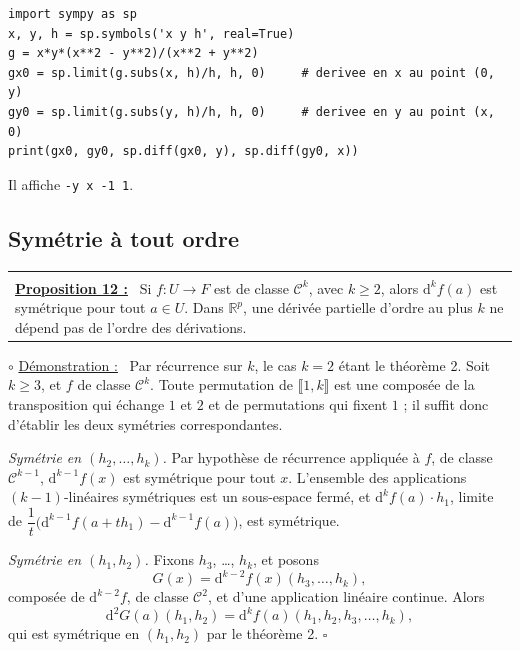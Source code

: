 \documentclass[a4paper,twoside]{report}
\makeatletter
\newenvironment{cadre}%
 {\par\vspace{2mm}\noindent\begin{tabular}{|@{\hspace{4mm}}p{0.93\textwidth}@{\hspace{4mm}}|}
  \hline \\[-2mm]}%
 {\\[2mm] \hline \end{tabular}\par\vspace{3mm}}
\newcommand{\propo}[1]{\textbf{\underline{Proposition #1 :}}~}
\newenvironment{demo}%
 {\par\needspace{4\baselineskip}\vspace{1mm}\noindent$\circ$ \underline{Démonstration :}~\setlength{\parskip}{3pt plus 1pt}}%
 {\hfill$\square$\par\vspace{2mm}}
\newcommand{\R}{\mathbb{R}}
\newcommand{\dd}{\mathrm{d}}                      %
\newcommand{\Cc}{\mathcal{C}}                     %
\makeatother
\begin{document}
\begin{lstlisting}
import sympy as sp
x, y, h = sp.symbols('x y h', real=True)
g = x*y*(x**2 - y**2)/(x**2 + y**2)
gx0 = sp.limit(g.subs(x, h)/h, h, 0)     # derivee en x au point (0, y)
gy0 = sp.limit(g.subs(y, h)/h, h, 0)     # derivee en y au point (x, 0)
print(gx0, gy0, sp.diff(gx0, y), sp.diff(gy0, x))
\end{lstlisting}

\noindent Il affiche \texttt{-y x -1 1}.

\subsection{Symétrie à tout ordre}

\begin{cadre}
\propo{12} Si $f : U \to F$ est de classe $\Cc^{k}$, avec $k \geqslant 2$, alors $\dd^{k} f(a)$ est symétrique pour tout $a \in U$. Dans $\R^{p}$, une dérivée partielle d'ordre au plus $k$ ne dépend pas de l'ordre des dérivations.
\end{cadre}

\begin{demo}
Par récurrence sur $k$, le cas $k = 2$ étant le théorème 2. Soit $k \geqslant 3$, et $f$ de classe $\Cc^{k}$. Toute permutation de $\llbracket 1, k \rrbracket$ est une composée de la transposition qui échange $1$ et $2$ et de permutations qui fixent $1$ ; il suffit donc d'établir les deux symétries correspondantes.

\emph{Symétrie en $(h_{2}, \dots, h_{k})$.} Par hypothèse de récurrence appliquée à $f$, de classe $\Cc^{k - 1}$, $\dd^{k - 1} f(x)$ est symétrique pour tout $x$. L'ensemble des applications $(k - 1)$-linéaires symétriques est un sous-espace fermé, et $\dd^{k} f(a)\cdot h_{1}$, limite de $\dfrac{1}{t}\big(\dd^{k - 1} f(a + th_{1}) - \dd^{k - 1} f(a)\big)$, est symétrique.

\emph{Symétrie en $(h_{1}, h_{2})$.} Fixons $h_{3}$, \dots, $h_{k}$, et posons
\[ G(x) = \dd^{k - 2} f(x)(h_{3}, \dots, h_{k}), \]
composée de $\dd^{k - 2} f$, de classe $\Cc^{2}$, et d'une application linéaire continue. Alors
\[ \dd^{2} G(a)(h_{1}, h_{2}) = \dd^{k} f(a)(h_{1}, h_{2}, h_{3}, \dots, h_{k}), \]
qui est symétrique en $(h_{1}, h_{2})$ par le théorème 2.
\end{demo}
\end{document}
